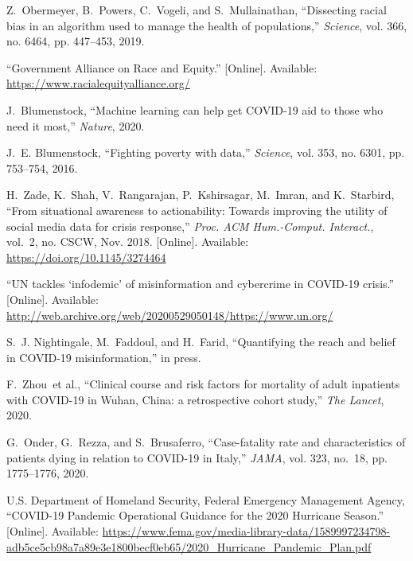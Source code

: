\begin{thebibliography}{10}
Z.~Obermeyer, B.~Powers, C.~Vogeli, and S.~Mullainathan, ``Dissecting racial
  bias in an algorithm used to manage the health of populations,''
  \emph{Science}, vol. 366, no. 6464, pp. 447--453, 2019.

\BIBentryALTinterwordspacing
``{Government Alliance on Race and Equity}.'' [Online]. Available:
  \url{https://www.racialequityalliance.org/}
\BIBentrySTDinterwordspacing

J.~Blumenstock, ``{Machine learning can help get COVID-19 aid to those who need
  it most},'' \emph{Nature}, 2020.

J.~E. Blumenstock, ``Fighting poverty with data,'' \emph{Science}, vol. 353,
  no. 6301, pp. 753--754, 2016.

\BIBentryALTinterwordspacing
H.~Zade, K.~Shah, V.~Rangarajan, P.~Kshirsagar, M.~Imran, and K.~Starbird,
  ``From situational awareness to actionability: Towards improving the utility
  of social media data for crisis response,'' \emph{Proc. ACM Hum.-Comput.
  Interact.}, vol.~2, no. CSCW, Nov. 2018. [Online]. Available:
  \url{https://doi.org/10.1145/3274464}
\BIBentrySTDinterwordspacing

\BIBentryALTinterwordspacing
``{UN tackles ‘infodemic’ of misinformation and cybercrime in COVID-19
  crisis}.'' [Online]. Available:
  \url{http://web.archive.org/web/20200529050148/https://www.un.org/}
\BIBentrySTDinterwordspacing

S.~J. Nightingale, M.~Faddoul, and H.~Farid, ``{Quantifying the reach and
  belief in COVID-19 misinformation},'' in press.

F.~Zhou~et al., ``{Clinical course and risk factors for mortality of adult
  inpatients with COVID-19 in Wuhan, China: a retrospective cohort study},''
  \emph{The Lancet}, 2020.

G.~Onder, G.~Rezza, and S.~Brusaferro, ``{Case-fatality rate and
  characteristics of patients dying in relation to COVID-19 in Italy},''
  \emph{JAMA}, vol. 323, no.~18, pp. 1775--1776, 2020.

\BIBentryALTinterwordspacing
{U.S. Department of Homeland Security, Federal Emergency Management Agency},
  ``{COVID-19 Pandemic Operational Guidance for the 2020 Hurricane Season}.''
  [Online]. Available:
  \url{https://www.fema.gov/media-library-data/1589997234798-adb5ce5cb98a7a89e3e1800becf0eb65/2020_Hurricane_Pandemic_Plan.pdf}
\BIBentrySTDinterwordspacing


\end{thebibliography}
